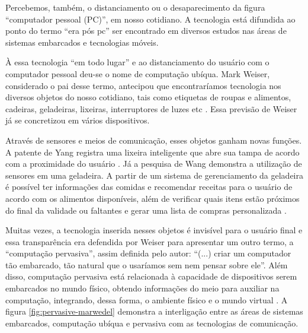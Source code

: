 Percebemos, também, o distanciamento ou o desaparecimento da figura ``computador
pessoal (PC)'', em nosso cotidiano. A tecnologia está difundida ao ponto do
termo  ``era pós pc'' ser encontrado em diversos estudos
\cite{bonilla2011inclusao,  chen2011pospc, press1999personal} nas áreas de
sistemas embarcados e  tecnologias móveis.

À essa tecnologia ``em todo lugar'' e ao distanciamento do usuário com o 
computador pessoal deu-se o nome de computação ubíqua. Mark Weiser, considerado 
o pai desse termo, antecipou que encontraríamos tecnologia nos diversos objetos
do nosso cotidiano, tais como etiquetas de roupas e alimentos, cadeiras, 
geladeiras, lixeiras, interruptores de luzes etc \cite{weiser1991computer}. Essa 
previsão de Weiser já se concretizou em vários dispositivos.

Através de sensores e meios de comunicação, esses objetos ganham novas funções.
A patente de Yang registra uma lixeira inteligente que abre sua tampa de acordo
com a proximidade do usuário \cite{yang2005trash}. Já a pesquisa de Wang
demonstra a utilização de sensores em uma geladeira. A partir de um sistema de
gerenciamento da geladeira é possível ter informações das comidas e recomendar
receitas para o usuário de acordo com os alimentos disponíveis, além de 
verificar quais itens estão próximos do final da validade ou faltantes e gerar 
uma lista de compras personalizada \cite{hou2013}.


Muitas vezes, a tecnologia inserida nesses objetos é invisível para o usuário
final e essa transparência era defendida por Weiser para apresentar um outro
termo, a ``computação pervasiva'', assim definida pelo autor: ``(...) criar  um
computador tão embarcado, tão natural que o usaríamos sem nem pensar sobre
ele''. Além disso, computação pervasiva está relacionada à capacidade de
dispositivos serem embarcados no mundo físico, obtendo informações do meio para
auxiliar na computação, integrando, dessa forma, o ambiente físico e o mundo
virtual \cite{bolsoni2009computaccao, de2003computaccao}. A figura  
\ref{fig:pervasive-marwedel} demonstra a interligação entre as áreas de sistemas
embarcados, computação ubíqua e pervasiva com as tecnologias de comunicação.

